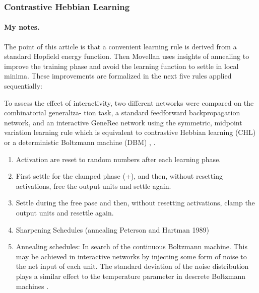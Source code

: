 \subsubsection{Contrastive Hebbian Learning}
\label{models-chl} 

\paragraph{My notes.}

The point of this article \citet{movellan1990contrastive} is that a convenient learning rule is derived from a standard Hopfield energy function. Then Movellan uses insights of annealing to improve the training phase and avoid the learning function to settle in local minima. These improvements are formalized in the next five rules applied sequentially:

To assess the effect of interactivity, two different networks were compared on the combinatorial generaliza-
tion task, a standard feedforward backpropagation network, and an interactive GeneRec network using the
symmetric, midpoint variation learning rule which is equivalent to contrastive Hebbian learning (CHL) or a
deterministic Boltzmann machine (DBM) \citet{o1996bio}, \citet{o2001generalization}. 

\begin{enumerate}
\item Activation are reset to random numbers after each learning phase. 

\item First settle for the clamped phase (+), and then, without resetting activations, free the output units and settle again. 

\item Settle during the free pase and then, without resetting activations, clamp the output units and resettle again. 

\item Sharpening Schedules (annealing Peterson and Hartman 1989)

\item Annealing schedules: In search of the continuous Boltzmann machine. This may be achieved in interactive networks by injecting some form of noise to the net input of each unit. The standard deviation of the noise distribution plays a similar effect to the temperature parameter in descrete Boltzmann machines \citet{movellan1990contrastive}. 
\end{enumerate}

